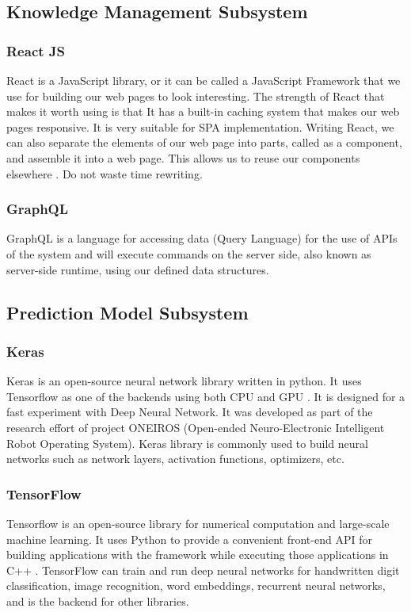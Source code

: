 \documentclass[12pt,oneside,openright,a4paper]{cpe-english-project}
\begin{document}
\subsection{Knowledge Management Subsystem}
\subsubsection{React JS}
React is a JavaScript library, or it can be called a JavaScript Framework that we use for building
our web pages to look interesting. The strength of React that makes it worth using is that It has
a built-in caching system that makes our web pages responsive. It is very suitable for SPA
implementation. Writing React, we can also separate the elements of our web page into parts,
called as a component, and assemble it into a web page. This allows us to reuse our components
elsewhere \cite{what_is_react}. Do not waste time rewriting.

\subsubsection{GraphQL}
GraphQL is a language for accessing data (Query Language) for the use of APIs of the system \cite{what_is_graphql}
and will execute commands on the server side, also known as server-side runtime, using our defined
data structures.

\subsection{Prediction Model Subsystem}
\subsubsection{Keras}
Keras is an open-source neural network library written in python. It uses Tensorflow as one of the
backends using both CPU and GPU \cite{keras}. It is designed for a fast experiment with Deep Neural
Network. It was developed as part of the research effort of project ONEIROS (Open-ended Neuro-Electronic
Intelligent Robot Operating System). Keras library is commonly used to build neural networks such as network
layers, activation functions, optimizers, etc.

\subsubsection{TensorFlow}
Tensorflow is an open-source library for numerical computation and large-scale machine learning.
It uses Python to provide a convenient front-end API for building applications with the framework
while executing those applications in C++ \cite{what_is_tf}. TensorFlow can train and run deep neural
networks for handwritten digit classification, image recognition, word embeddings, recurrent neural
networks, and is the backend for other libraries.
\end{document}
